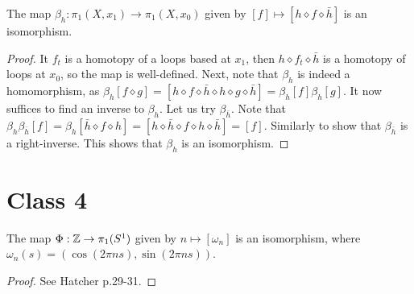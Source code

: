 \documentclass{../mathnotes}
\begin{document}
\begin{prop}
    The map $\beta_h:\pi_1(X,x_1)\to\pi_1(X,x_0)$ given by $[f]\mapsto[h\diamond f\diamond \bar h]$
    is an isomorphism.
\end{prop}
\begin{proof}
    It $f_t$ is a homotopy of a loops based at $x_1$, then $h\diamond f_t\diamond\bar h$ is a homotopy
    of loops at $x_0$, so the map is well-defined. Next, note that $\beta_h$ is indeed a homomorphism,
    as $\beta_h[f\diamond g]=[h\diamond f\diamond \bar h\diamond h\diamond g\diamond \bar h]=\beta_h[f]\beta_h[g]$.
    It now suffices to find an inverse to $\beta_h$. Let us try $\beta_{\bar h}$. Note that
    $\beta_h\beta_{\bar h}[f]=\beta_h[\bar h\diamond f\diamond h]=[h\diamond\bar h\diamond f\diamond h\diamond\bar h]=[f]$.
    Similarly to show that $\beta_{\bar h}$ is a right-inverse. This shows that $\beta_h$ is an isomorphism.
\end{proof}

\section*{Class 4}

\begin{thm}
    The map $\Phi:\mathbb{Z}\to\pi_1(S^1)$ given by $n\mapsto [\omega_n]$ is an isomorphism, where
    $\omega_n(s)=\left( \cos(2\pi ns),\sin(2\pi ns) \right)$.
\end{thm}
\begin{proof}
    See Hatcher p.29-31.
\end{proof}
\end{document}
